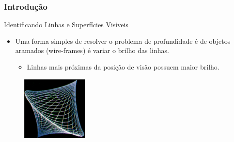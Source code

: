 \documentclass{beamer}
\begin{document}
\begin{frame}
\frametitle{Introdução}


	\begin{block}{Identificando Linhas e Superfícies Visíveis}
		\begin{itemize}
			\item Uma forma simples de resolver o problema de profundidade é de objetos aramados (wire-frames) é variar o brilho das linhas.
			\begin{itemize}
				\item Linhas mais próximas da posição de visão possuem maior brilho.
			\end{itemize}
		\end{itemize}
	\end{block}
	
	\begin{figure}[!h]
			\begin{center}
			\includegraphics[width=0.3\textwidth]{Figures/WirFra}
			\end{center}
	\end{figure}	
\end{frame}
\end{document}
